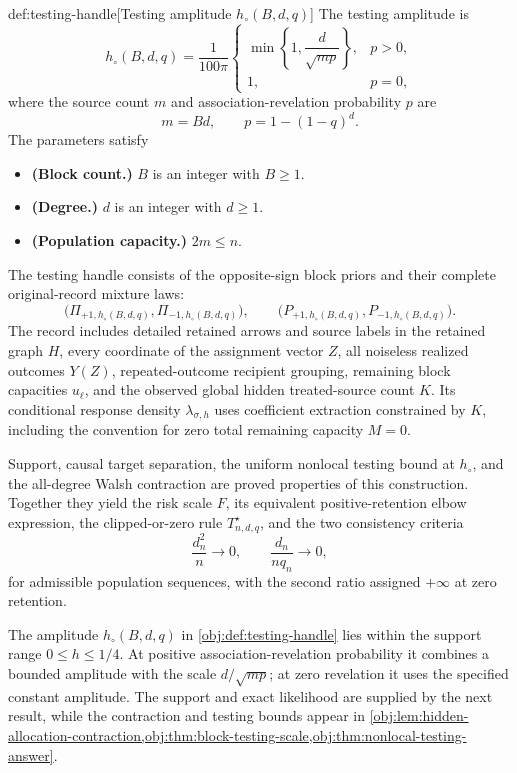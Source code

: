 \documentclass[11pt]{article}
\begin{document}
\begin{definitionv}{def:testing-handle}[Testing amplitude $h_\circ(B,d,q)$]
The testing amplitude is
\[
h_\circ(B,d,q)=\frac{1}{100\pi}
\begin{cases}
\min\left\{1,\dfrac{d}{\sqrt{mp}}\right\},&p>0,\\
1,&p=0,
\end{cases}
\]
where the source count \(m\) and association-revelation probability \(p\) are
\[
m=Bd,
\qquad
p=1-(1-q)^d.
\]
The parameters satisfy
\begin{itemize}
\item \textbf{(Block count.)} \(B\) is an integer with \(B\ge1\).
\item \textbf{(Degree.)} \(d\) is an integer with \(d\ge1\).
\item \textbf{(Population capacity.)} \(2m\le n\).
\end{itemize}
The testing handle consists of the opposite-sign block priors and their complete original-record mixture laws:
\[
\bigl(\Pi_{+1,h_\circ(B,d,q)},\Pi_{-1,h_\circ(B,d,q)}\bigr),
\qquad
\bigl(P_{+1,h_\circ(B,d,q)},P_{-1,h_\circ(B,d,q)}\bigr).
\]
The record includes detailed retained arrows and source labels in the retained graph \(H\), every coordinate of the assignment vector \(Z\), all noiseless realized outcomes \(Y(Z)\), repeated-outcome recipient grouping, remaining block capacities \(u_\ell\), and the observed global hidden treated-source count \(K\). Its conditional response density \(\lambda_{\sigma,h}\) uses coefficient extraction constrained by \(K\), including the convention for zero total remaining capacity \(M=0\).

Support, causal target separation, the uniform nonlocal testing bound at \(h_\circ\), and the all-degree Walsh contraction are proved properties of this construction. Together they yield the risk scale \(F\), its equivalent positive-retention elbow expression, the clipped-or-zero rule \(T^\star_{n,d,q}\), and the two consistency criteria
\[
\frac{d_n^2}{n}\longrightarrow0,
\qquad
\frac{d_n}{nq_n}\longrightarrow0,
\]
for admissible population sequences, with the second ratio assigned \(+\infty\) at zero retention.
\end{definitionv}

The amplitude \(h_\circ(B,d,q)\) in \cref{obj:def:testing-handle} lies within the support range \(0\le h\le1/4\). At positive association-revelation probability it combines a bounded amplitude with the scale \(d/\sqrt{mp}\); at zero revelation it uses the specified constant amplitude. The support and exact likelihood are supplied by the next result, while the contraction and testing bounds appear in \cref{obj:lem:hidden-allocation-contraction,obj:thm:block-testing-scale,obj:thm:nonlocal-testing-answer}.
\end{document}
